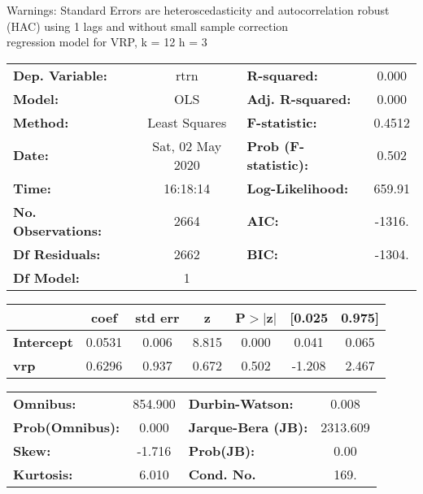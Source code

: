 Warnings: \newline
 [1] Standard Errors are heteroscedasticity and autocorrelation robust (HAC) using 1 lags and without small sample correction\\ 

regression model for VRP, k = 12 h = 3\begin{center}
\begin{tabular}{lclc}
\toprule
\textbf{Dep. Variable:}    &       rtrn       & \textbf{  R-squared:         } &     0.000   \\
\textbf{Model:}            &       OLS        & \textbf{  Adj. R-squared:    } &     0.000   \\
\textbf{Method:}           &  Least Squares   & \textbf{  F-statistic:       } &    0.4512   \\
\textbf{Date:}             & Sat, 02 May 2020 & \textbf{  Prob (F-statistic):} &    0.502    \\
\textbf{Time:}             &     16:18:14     & \textbf{  Log-Likelihood:    } &    659.91   \\
\textbf{No. Observations:} &        2664      & \textbf{  AIC:               } &    -1316.   \\
\textbf{Df Residuals:}     &        2662      & \textbf{  BIC:               } &    -1304.   \\
\textbf{Df Model:}         &           1      & \textbf{                     } &             \\
\bottomrule
\end{tabular}
\begin{tabular}{lcccccc}
                   & \textbf{coef} & \textbf{std err} & \textbf{z} & \textbf{P$> |$z$|$} & \textbf{[0.025} & \textbf{0.975]}  \\
\midrule
\textbf{Intercept} &       0.0531  &        0.006     &     8.815  &         0.000        &        0.041    &        0.065     \\
\textbf{vrp}       &       0.6296  &        0.937     &     0.672  &         0.502        &       -1.208    &        2.467     \\
\bottomrule
\end{tabular}
\begin{tabular}{lclc}
\textbf{Omnibus:}       & 854.900 & \textbf{  Durbin-Watson:     } &    0.008  \\
\textbf{Prob(Omnibus):} &   0.000 & \textbf{  Jarque-Bera (JB):  } & 2313.609  \\
\textbf{Skew:}          &  -1.716 & \textbf{  Prob(JB):          } &     0.00  \\
\textbf{Kurtosis:}      &   6.010 & \textbf{  Cond. No.          } &     169.  \\
\bottomrule
\end{tabular}
\end{center}

